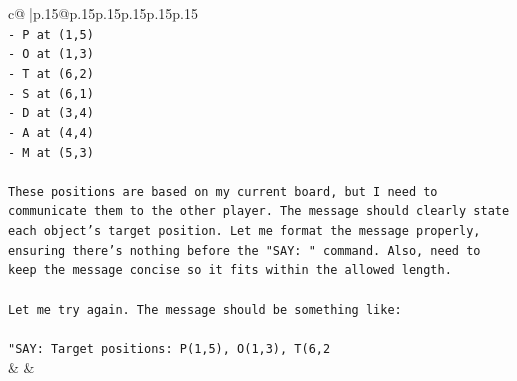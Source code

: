 \documentclass{article}
\begin{document}
{\begin{supertabular}{c@{$\;$}|p{.15\linewidth}@{}p{.15\linewidth}p{.15\linewidth}p{.15\linewidth}p{.15\linewidth}p{.15\linewidth}}
{{{\\ 
\texttt{{-} P at (1,5)} \\
\texttt{{-} O at (1,3)} \\
\texttt{{-} T at (6,2)} \\
\texttt{{-} S at (6,1)} \\
\texttt{{-} D at (3,4)} \\
\texttt{{-} A at (4,4)} \\
\texttt{{-} M at (5,3)} \\
\\ 
\texttt{These positions are based on my current board, but I need to communicate them to the other player. The message should clearly state each object's target position. Let me format the message properly, ensuring there's nothing before the "SAY: " command. Also, need to keep the message concise so it fits within the allowed length.} \\
\\ 
\texttt{Let me try again. The message should be something like:} \\
\\ 
\texttt{"SAY: Target positions: P(1,5), O(1,3), T(6,2} \\
            }
        }
    }
    & & \\ \\


\end{supertabular}}
\end{document}
